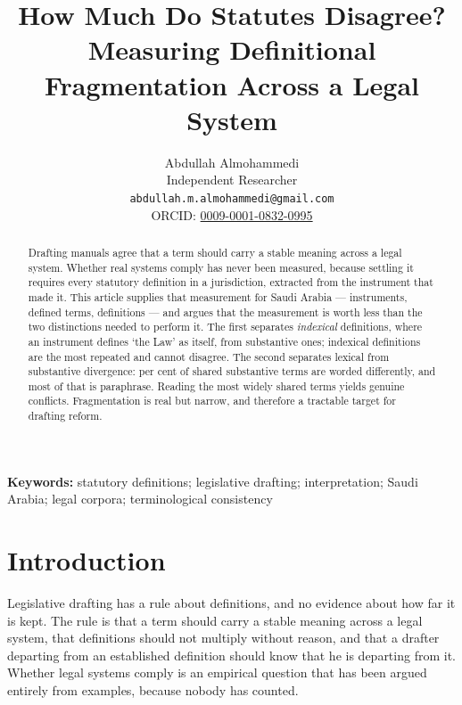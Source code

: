 \documentclass[11pt]{article}
\title{How Much Do Statutes Disagree?\\
Measuring Definitional Fragmentation Across a Legal System}
\author{}
\date{}
\author{Abdullah Almohammedi \\
    Independent Researcher \\
    \texttt{abdullah.m.almohammedi@gmail.com} \\
    ORCID: \href{https://orcid.org/0009-0001-0832-0995}{0009-0001-0832-0995}}
\date{}
\begin{document}
\maketitle

\begin{abstract}
\noindent
Drafting manuals agree that a term should carry a stable meaning across a
legal system. Whether real systems comply has never been measured, because
settling it requires every statutory definition in a jurisdiction, extracted
from the instrument that made it. This article supplies that measurement for
Saudi Arabia --- \nInstruments{} instruments, \nTerms{} defined terms,
\nDefinitions{} definitions --- and argues that the measurement is worth less
than the two distinctions needed to perform it. The first separates
\emph{indexical} definitions, where an instrument defines `the Law' as itself,
from substantive ones; indexical definitions are the most repeated and cannot
disagree. The second separates lexical from substantive divergence:
\nDivergentShare{} per cent of shared substantive terms are worded
differently, and most of that is paraphrase. Reading the \nReviewed{} most
widely shared terms yields \nConflicting{} genuine conflicts. Fragmentation is
real but narrow, and therefore a tractable target for drafting reform.
\end{abstract}

\vspace{1em}\noindent\textbf{Keywords:} statutory definitions; legislative
drafting; interpretation; Saudi Arabia; legal corpora; terminological
consistency
\vspace{1.5em}

\section{Introduction}

Legislative drafting has a rule about definitions, and no evidence about how
far it is kept. The rule is that a term should carry a stable meaning across a
legal system, that definitions should not multiply without reason, and that a
drafter departing from an established definition should know that he is
departing from it. Whether legal systems comply is an empirical question that
has been argued entirely from examples, because nobody has counted.
\end{document}
